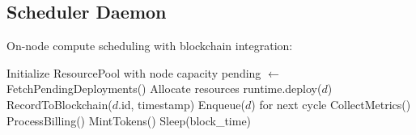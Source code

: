 \subsection{Scheduler Daemon}

On-node compute scheduling with blockchain integration:

\begin{algorithm}
\caption{Scheduler Daemon Main Loop}
\begin{algorithmic}[1]
\STATE Initialize ResourcePool with node capacity
\LOOP
    \STATE pending $\leftarrow$ FetchPendingDeployments()
            \STATE Allocate resources
            \STATE runtime.deploy($d$)
            \STATE RecordToBlockchain($d$.id, timestamp)
        \ELSE
            \STATE Enqueue($d$) for next cycle
        \ENDIF
    \ENDFOR
    \STATE CollectMetrics()
        \STATE ProcessBilling()
        \STATE MintTokens()
    \ENDIF
    \STATE Sleep(block\_time)
\ENDLOOP
\end{algorithmic}
\end{algorithm}

